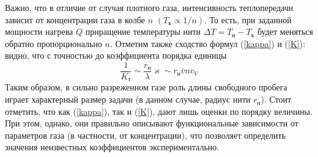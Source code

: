 \documentclass[12pt]{article}
\begin{document}
        Важно, что в отличие от случая плотного газа, интенсивность теплопередачи зависит от концентрации газа в колбе $n$ $(T_{\text{к}} \propto 1/n)$. То есть,
        при заданной мощности нагрева $Q$ приращение температуры нити $\Delta T = T_{\text{н}}-T_{\text{к}}$ будет
        меняться обратно пропорционально $n$. Отметим также сходство формул (\ref{kappa}) и (\ref{K}): видно, что с точностью до коэффициента порядка единицы
        \[
            \frac{1}{K_{\text{т}}} \sim \frac{r_{\text{н}}}{\lambda}\varkappa \sim r_{\text{н}}\overline{v}nc_V
        \]
        Таким образом, в сильно разреженном газе роль длины свободного пробега
        играет характерный размер задачи (в данном случае, радиус нити $r_{\text{н}}$). Стоит отметить, что как (\ref{kappa}), так и (\ref{K}), дают лишь оценки по порядку
        величины. При этом, однако, они правильно описывают функциональные зависимости от параметров газа (в частности, от концентрации), что позволяет
        определить значения неизвестных коэффициентов экспериментально.\\
\end{document}
